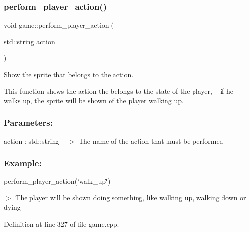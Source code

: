 \subsubsection{\texorpdfstring{perform\+\_\+player\+\_\+action()}{perform\_player\_action()}}
{\footnotesize\ttfamily void game\+::perform\+\_\+player\+\_\+action (\begin{DoxyParamCaption}\item[{std\+::string}]{action }\end{DoxyParamCaption})\hspace{0.3cm}{\ttfamily [private]}}



Show the sprite that belongs to the action. 

This function shows the action the belongs to the state of the player, ~\newline
if he walks up, the sprite will be shown of the player walking up. ~\newline


\subsubsection*{Parameters\+: }

action \+: std\+::string~\newline
-\/$>$ The name of the action that must be performed

\subsubsection*{Example\+: }

perform\+\_\+player\+\_\+action(\char`\"{}walk\+\_\+up\char`\"{}) ~\newline

\begin{DoxyItemize}
\item $>$ The player will be shown doing something, like walking up, walking down or dying 
\end{DoxyItemize}

Definition at line 327 of file game.\+cpp.

